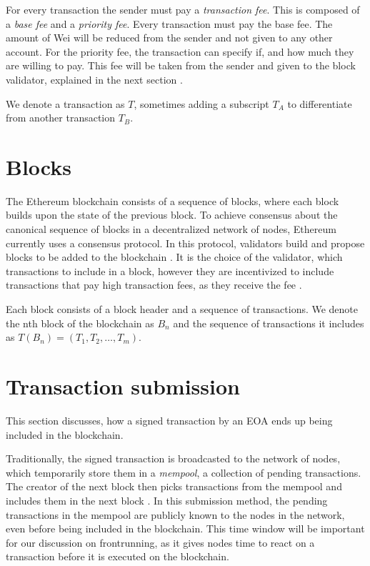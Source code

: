 \documentclass[draft,final]{vutinfth} %
\begin{document}

For every transaction the sender must pay a \emph{transaction fee}. This is composed of a \emph{base fee} and a \emph{priority fee}. Every transaction must pay the base fee. The amount of Wei will be reduced from the sender and not given to any other account. For the priority fee, the transaction can specify if, and how much they are willing to pay. This fee will be taken from the sender and given to the block validator, explained in the next section \cite[p.8]{wood_ethereum_2024}.

We denote a transaction as $T$, sometimes adding a subscript $T_A$ to differentiate from another transaction $T_B$.


\section{Blocks}

The Ethereum blockchain consists of a sequence of blocks, where each block builds upon the state of the previous block. To achieve consensus about the canonical sequence of blocks in a decentralized network of nodes, Ethereum currently uses a consensus protocol. In this protocol, validators build and propose blocks to be added to the blockchain \cite{noauthor_gasper_2024}. It is the choice of the validator, which transactions to include in a block, however they are incentivized to include transactions that pay high transaction fees, as they receive the fee \cite[p.8]{wood_ethereum_2024}.

Each block consists of a block header and a sequence of transactions. We denote the nth block of the blockchain as $B_n$ and the sequence of transactions it includes as $T(B_n) = (T_1, T_2, \dots, T_m)$.

\section{Transaction submission}

This section discusses, how a signed transaction by an EOA ends up being included in the blockchain.

Traditionally, the signed transaction is broadcasted to the network of nodes, which temporarily store them in a \emph{mempool}, a collection of pending transactions. The creator of the next block then picks transactions from the mempool and includes them in the next block \cite{eskandari_sok_2020}. In this submission method, the pending transactions in the mempool are publicly known to the nodes in the network, even before being included in the blockchain. This time window will be important for our discussion on frontrunning, as it gives nodes time to react on a transaction before it is executed on the blockchain.
\end{document}
